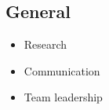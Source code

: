 \documentclass[
    10pt,
]
{article}
\begin{document}
\begin{figure}
\begin{minipage}[t]{0.32\textwidth}
\subsection{General}
\begin{itemize}[itemsep=0em]
    \item Research
    \item Communication
    \item Team leadership
\end{itemize}

\end{minipage}
\end{figure}









\end{document}
